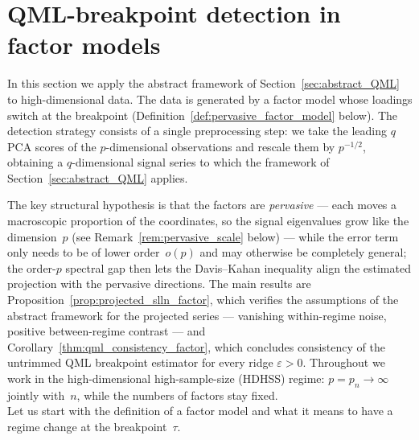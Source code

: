\documentclass[10pt, letterpaper]{amsart}
\begin{document}
\section{QML-breakpoint detection in factor models}\label{sec:breakpoint_detection_in_factor_models}

In this section we apply the abstract framework of Section~\ref{sec:abstract_QML} to high-dimensional data. The data is generated by a factor model whose loadings switch at the breakpoint (Definition~\ref{def:pervasive_factor_model} below). The detection strategy consists of a single preprocessing step:  we take the leading $q$ PCA scores of the $p$-dimensional observations and rescale them by $p^{-1/2}$, obtaining a $q$-dimensional signal series to which the framework of Section~\ref{sec:abstract_QML} applies.

The key structural hypothesis is that the factors are \emph{pervasive} --- each moves a macroscopic proportion of the coordinates, so the signal eigenvalues grow like the dimension~$p$ (see Remark~\ref{rem:pervasive_scale} below) --- while the error term only needs to be of lower order~$o(p)$ and may otherwise be completely general; the order-$p$ spectral gap then lets the Davis--Kahan inequality align the estimated projection with the pervasive directions. The main results are Proposition~\ref{prop:projected_slln_factor}, which verifies the assumptions of the abstract framework for the projected series --- vanishing within-regime noise, positive between-regime contrast --- and Corollary~\ref{thm:qml_consistency_factor}, which concludes consistency of the untrimmed QML breakpoint estimator for every ridge $\varepsilon>0$. Throughout we work in the high-dimensional high-sample-size (HDHSS) regime: $p=p_n\to\infty$ jointly with~$n$, while the numbers of factors stay fixed.\\

Let us start with the definition of a factor model and what it means to have a regime change at the breakpoint~$\tau$.
\end{document}
